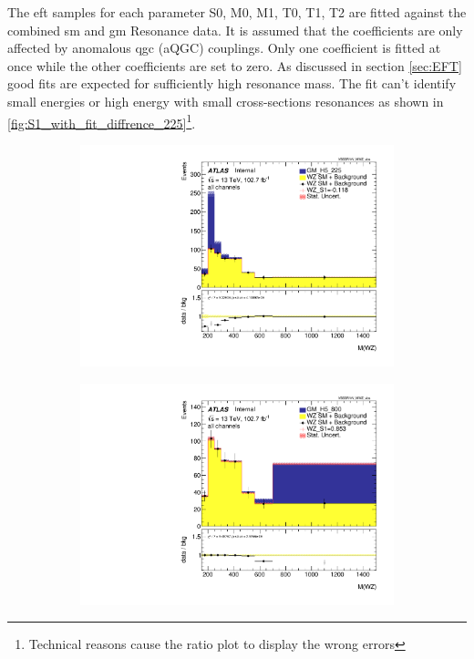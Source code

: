 \documentclass[../Bachelorarbeit.tex]{subfiles}
\begin{document}
\label{sec:results}
The \acrshort{eft} samples for each parameter S0, M0, M1, T0, T1, T2 are fitted against the combined \acrshort{sm} and \acrshort{gm} Resonance data. It is assumed that the coefficients are only affected by anomalous \acrshort{qgc} (aQGC) couplings.
Only one coefficient is fitted at once while the other coefficients are set to zero. As discussed in section \ref{sec:EFT} good fits are expected for sufficiently high resonance mass.
The fit can't identify small energies or high energy with small cross-sections resonances as shown in \ref{fig:S1_with_fit_diffrence_225}\footnote{Technical reasons cause the ratio plot to display the wrong errors}.

\begin{figure}[h]
    \centering
    \begin{subfigure}{0.3\textwidth}
        \includegraphics[width=\textwidth]{Plots/ALL_MWZ_right_color/GM_H5_225/S1/2022-05-07/VBSSR/all_VV_MWZ_vbs.pdf}
        \caption{}
    \end{subfigure}
    \begin{subfigure}{0.3\textwidth}
        \includegraphics[width=\textwidth]{Plots/ALL_MWZ_right_color/GM_H5_800/S1/2022-05-07/VBSSR/all_VV_MWZ_vbs.pdf}

\end{subfigure}
\end{figure}
\end{document}
